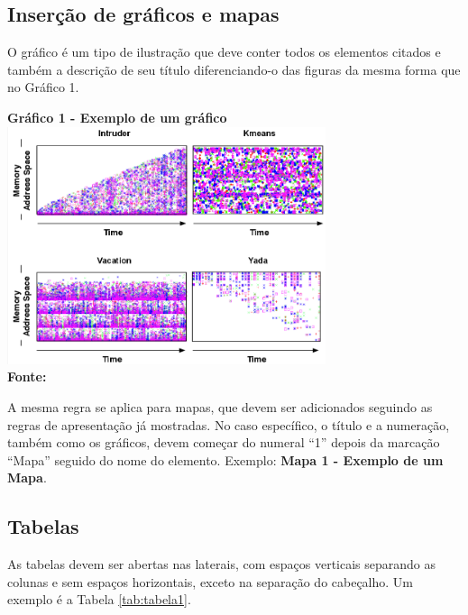 \subsection{\esp Inserção de gráficos e mapas}

O gráfico é um tipo de ilustração que deve conter todos os elementos citados e também a descrição de seu título
diferenciando-o das figuras da mesma forma que no Gráfico 1.

\begin{center}
	\centering
	\textbf{Gráfico 1 - Exemplo de um gráfico} \\
	\includegraphics[width=0.7\textwidth]{figuras/access.png}
	\vspace{-0.3cm}
	\\\textbf{\footnotesize Fonte: \cite{tese}}
	\label{grafico1}
\end{center}

A mesma regra se aplica para mapas, que devem ser adicionados seguindo as regras de apresentação já mostradas. No caso específico,
o título e a numeração, também como os gráficos, devem começar do numeral ``1'' depois da marcação ``Mapa'' seguido do nome do elemento.
Exemplo: \textbf{Mapa 1 - Exemplo de um Mapa}.

\subsection{\esp Tabelas}

As tabelas devem ser abertas nas laterais, com espaços verticais separando
as colunas e sem espaços horizontais, exceto na
separação do cabeçalho. Um exemplo é a Tabela \ref{tab:tabela1}.

